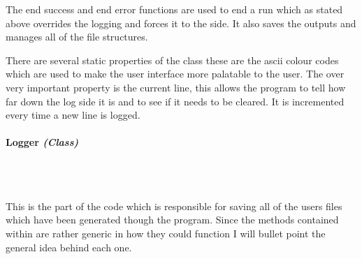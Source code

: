 \begin{FlushLeft}
    The end success and end error functions are used to end a run which as stated above overrides the logging and forces it to the side. It also saves the outputs and manages all of the file structures. \\ \bk

    There are several static properties of the class these are the ascii colour codes which are used to make the user interface more palatable to the user. The over very important property is the current line, this allows the program to tell how far down the log side it is and to see if it needs to be cleared. It is incremented every time a new line is logged. \\

    \bk

    \paragraph{Logger \textit{(Class)}} \mbox{} \\

    \begin{figure}[H]
        \centering
    \end{figure}\\

    This is the part of the code which is responsible for saving all of the users files which have been generated though the program. Since the methods contained within are rather generic in how they could function I will bullet point the general idea behind each one.


\end{FlushLeft}
